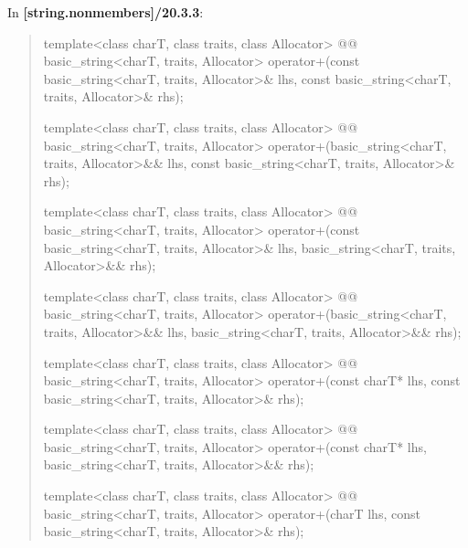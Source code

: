 \documentclass{wg21}
\begin{document}
In \textbf{[string.nonmembers]/20.3.3}:
\begin{quote}
\begin{itemdecl}
template<class charT, class traits, class Allocator>
  @@
  basic_string<charT, traits, Allocator>
    operator+(const basic_string<charT, traits, Allocator>& lhs,
              const basic_string<charT, traits, Allocator>& rhs);
\end{itemdecl}

\begin{itemdecl}
template<class charT, class traits, class Allocator>
  @@
  basic_string<charT, traits, Allocator>
    operator+(basic_string<charT, traits, Allocator>&& lhs,
              const basic_string<charT, traits, Allocator>& rhs);
\end{itemdecl}

\begin{itemdecl}
template<class charT, class traits, class Allocator>
  @@
  basic_string<charT, traits, Allocator>
    operator+(const basic_string<charT, traits, Allocator>& lhs,
              basic_string<charT, traits, Allocator>&& rhs);
\end{itemdecl}

\begin{itemdecl}
template<class charT, class traits, class Allocator>
  @@
  basic_string<charT, traits, Allocator>
    operator+(basic_string<charT, traits, Allocator>&& lhs,
              basic_string<charT, traits, Allocator>&& rhs);
\end{itemdecl}

\begin{itemdecl}
template<class charT, class traits, class Allocator>
  @@
  basic_string<charT, traits, Allocator>
    operator+(const charT* lhs, const basic_string<charT, traits, Allocator>& rhs);
\end{itemdecl}

\begin{itemdecl}
template<class charT, class traits, class Allocator>
  @@
  basic_string<charT, traits, Allocator>
    operator+(const charT* lhs, basic_string<charT, traits, Allocator>&& rhs);
\end{itemdecl}

\begin{itemdecl}
template<class charT, class traits, class Allocator>
  @@
  basic_string<charT, traits, Allocator>
    operator+(charT lhs, const basic_string<charT, traits, Allocator>& rhs);
\end{itemdecl}


\end{quote}
\end{document}
